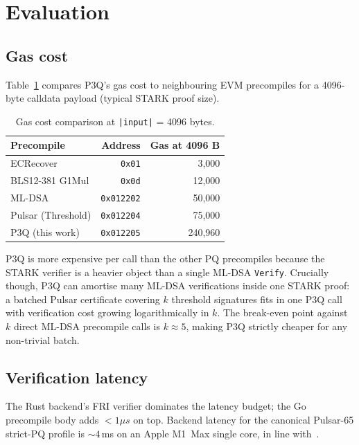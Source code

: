 \documentclass[11pt,a4paper]{article}
\begin{document}
\section{Evaluation}\label{sec:eval}

\subsection{Gas cost}

Table~\ref{tab:gas} compares P3Q's gas cost to neighbouring EVM
precompiles for a 4096-byte calldata payload (typical STARK proof
size).

\begin{table}[h]
\centering
\caption{Gas cost comparison at \texttt{|input|} = 4096 bytes.}
\label{tab:gas}
\begin{tabular}{lrr}
\toprule
Precompile & Address & Gas at 4096 B \\
\midrule
ECRecover & \texttt{0x01} & 3{,}000 \\
BLS12-381 G1Mul & \texttt{0x0d} & 12{,}000 \\
ML-DSA & \texttt{0x012202} & 50{,}000 \\
Pulsar (Threshold) & \texttt{0x012204} & 75{,}000 \\
P3Q (this work) & \texttt{0x012205} & 240{,}960 \\
\bottomrule
\end{tabular}
\end{table}

P3Q is more expensive per call than the other PQ precompiles because
the STARK verifier is a heavier object than a single ML-DSA
\texttt{Verify}. Crucially though, P3Q can amortise many ML-DSA
verifications inside one STARK proof: a batched Pulsar certificate
covering $k$ threshold signatures fits in one P3Q call with
verification cost growing logarithmically in $k$. The break-even
point against $k$ direct ML-DSA precompile calls is $k \approx 5$,
making P3Q strictly cheaper for any non-trivial batch.

\subsection{Verification latency}

The Rust backend's FRI verifier dominates the latency budget; the Go
precompile body adds $< 1\mu s$ on top. Backend latency for the
canonical Pulsar-65 strict-PQ profile is $\sim 4$\,ms on an Apple
M1~Max single core, in line with~\cite{plonky3-bench}.
\end{document}
